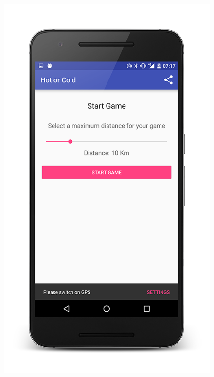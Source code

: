 \documentclass[10pt, a4paper]{article}
\begin{document}
\begin{figure}[!htb]
  \includegraphics[width=1.0\textwidth]{phone_startgame_1}
  \caption{}
\endminipage\hfill
{}%

\end{figure}
\end{document}
